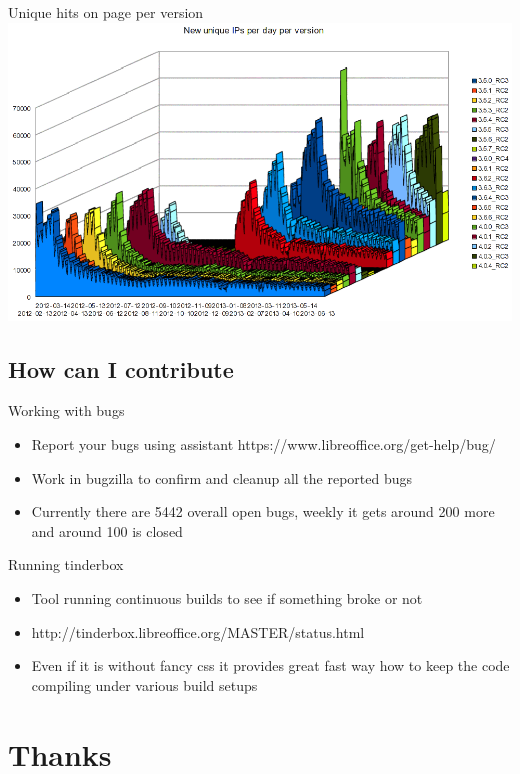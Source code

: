 \documentclass{beamer}
\begin{document}
\begin{frame}{Unique hits on page per version}
	\includegraphics[width= 1.0\linewidth]{downloads-unique.png}
\end{frame}

\subsection{How can I contribute}

\begin{frame}[t]{Working with bugs}
	\begin{itemize}
	\item Report your bugs using assistant https://www.libreoffice.org/get-help/bug/
	\item Work in bugzilla to confirm and cleanup all the reported bugs
	\item Currently there are 5442 overall open bugs, weekly it gets around 200 more and around 100 is closed
	\end{itemize}
\end{frame}

\begin{frame}[t]{Running tinderbox}
	\begin{itemize}
	\item Tool running continuous builds to see if something broke or not
	\item http://tinderbox.libreoffice.org/MASTER/status.html
	\item Even if it is without fancy css it provides great fast way how to keep the code compiling under various build setups
	\end{itemize}
\end{frame}

\section{Thanks}
\end{document}
